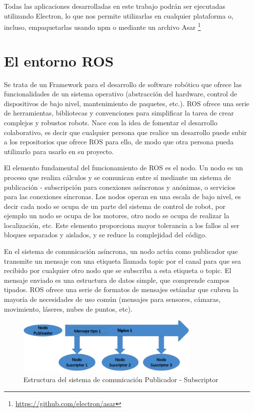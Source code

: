 Todas las aplicaciones desarrolladas en este trabajo podrán ser ejecutadas utilizando Electron, lo que nos permite utilizarlas en cualquier plataforma o, incluso, empaquetarlas usando npm o mediante un archivo Asar \footnote{\url{https://github.com/electron/asar}}

\section{El entorno ROS}
Se trata de un Framework para el desarrollo de software robótico que ofrece las funcionalidades de un sistema operativo (abstracción del hardware, control de dispositivos de bajo nivel, mantenimiento de paquetes, etc.). ROS ofrece una serie de herramientas, bibliotecas y convenciones para simplificar la tarea de crear complejos y robustos robots. Nace con la idea de fomentar el desarrollo colaborativo, es decir que cualquier persona que realice un desarrollo puede subir a los repositorios que ofrece ROS para ello, de modo que otra persona pueda utilizarlo para usarlo en su proyecto.

El elemento fundamental del funcionamiento de ROS es el nodo. Un nodo es un proceso que realiza cálculos y se comunican entre sí mediante un sistema de publicación - subscripción para conexiones asíncronas y anónimas, o servicios para las conexiones síncronas. Los nodos operan en una escala de bajo nivel, es decir cada nodo se ocupa de un parte del sistema de control de robot, por ejemplo un nodo se ocupa de los motores, otro nodo se ocupa de realizar la localización, etc. Este elemento proporciona mayor tolerancia a los fallos al ser bloques separados y aislados, y se reduce la complejidad del código.

En el sistema de comunicación asíncrona, un nodo actúa como publicador que transmite un mensaje con una etiqueta llamada topic por el canal para que sea recibido por cualquier otro nodo que se subscriba a esta etiqueta o topic. El mensaje enviado es una estructura de datos simple, que comprende campos tipados. ROS ofrece una serie de formatos de mensajes estándar que cubren la mayoría de necesidades de uso común (mensajes para sensores, cámaras, movimiento, láseres, nubes de puntos, etc).

\begin{figure}[H]
  \begin{center}
    \includegraphics[width=0.8\textwidth]{figures/publicadorsubscriptor.png}
		\caption{Estructura del sistema de comunicación Publicador - Subscriptor}
		\label{fig.publicadorsubscriptor}
		\end{center}
\end{figure}

